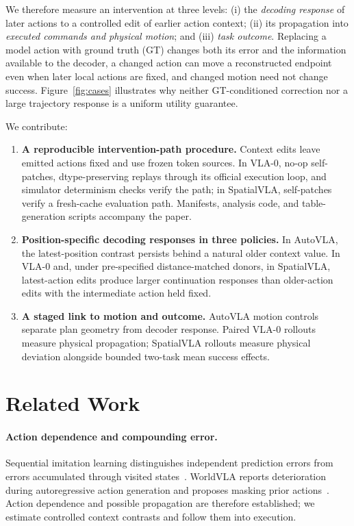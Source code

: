 We therefore measure an intervention at three levels: (i) the \emph{decoding response} of later actions to a controlled edit of earlier action context; (ii) its propagation into \emph{executed commands and physical motion}; and (iii) \emph{task outcome}. Replacing a model action with ground truth (GT) changes both its error and the information available to the decoder, a changed action can move a reconstructed endpoint even when later local actions are fixed, and changed motion need not change success. Figure~\ref{fig:cases} illustrates why neither GT-conditioned correction nor a large trajectory response is a uniform utility guarantee.

We contribute:
\begin{enumerate}[leftmargin=*,itemsep=1pt,topsep=2pt]
\item \textbf{A reproducible intervention-path procedure.} Context edits leave emitted actions fixed and use frozen token sources. In VLA-0, no-op self-patches, dtype-preserving replays through its official execution loop, and simulator determinism checks verify the path; in SpatialVLA, self-patches verify a fresh-cache evaluation path. Manifests, analysis code, and table-generation scripts accompany the paper.
\item \textbf{Position-specific decoding responses in three policies.} In AutoVLA, the latest-position contrast persists behind a natural older context value. In VLA-0 and, under pre-specified distance-matched donors, in SpatialVLA, latest-action edits produce larger continuation responses than older-action edits with the intermediate action held fixed.
\item \textbf{A staged link to motion and outcome.} AutoVLA motion controls separate plan geometry from decoder response. Paired VLA-0 rollouts measure physical propagation; SpatialVLA rollouts measure physical deviation alongside bounded two-task mean success effects.
\end{enumerate}

\section{Related Work}
\paragraph{Action dependence and compounding error.}
Sequential imitation learning distinguishes independent prediction errors from errors accumulated through visited states~\cite{ross2011dagger}. WorldVLA reports deterioration during autoregressive action generation and proposes masking prior actions~\cite{cen2025worldvla}. Action dependence and possible propagation are therefore established; we estimate controlled context contrasts and follow them into execution.

